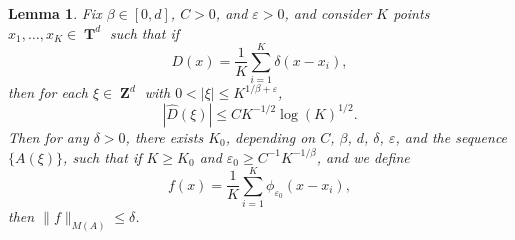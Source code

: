 \documentclass[12pt,reqno]{article}
\numberwithin{equation}{section}
\DeclareMathOperator{\ZZ}{\mathbf{Z}}
\DeclareMathOperator{\TT}{\mathbf{T}}
\newtheorem{lemma}[theorem]{Lemma}
\begin{document}
\begin{lemma} \label{Lemma65493}
    Fix $\beta \in [0,d]$, $C > 0$, and $\varepsilon > 0$, and consider $K$ points $x_1, \dots, x_K \in \TT^d$ such that if
    \[ D(x) = \frac{1}{K} \sum_{i = 1}^K \delta(x - x_i), \]
    then for each $\xi \in \ZZ^d$ with $0 < |\xi| \leq K^{1/\beta + \varepsilon}$,
    \begin{equation} \label{equationFFOSOXPFFGHI}
        |\widehat{D}(\xi)| \leq C K^{-1/2} \log(K)^{1/2}.
    \end{equation}
    Then for any $\delta > 0$, there exists $K_0$, depending on $C$, $\beta$, $d$, $\delta$, $\varepsilon$, and the sequence $\{ A(\xi) \}$, such that if $K \geq K_0$ and $\varepsilon_0 \geq C^{-1} K^{-1/\beta}$, and we define
    \[ f(x) = \frac{1}{K} \sum_{i = 1}^K \phi_{\varepsilon_0}(x - x_i), \]
    then $\| f \|_{M(A)} \leq \delta$.
\end{lemma}
\end{document}
